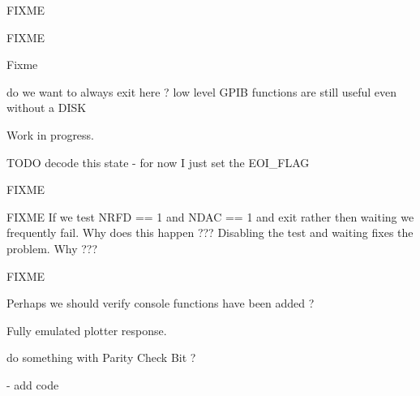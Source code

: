 \begin{DoxyRefList}
F\+I\+X\+ME 

F\+I\+X\+ME 

Fixme  
\item[\label{todo__todo000016}%
\hypertarget{todo__todo000016}{}%
Global \hyperlink{gpib__task_8h_a903eb44d83bf8f2db71e6f32a35fec62}{gpib\+\_\+error\+\_\+test} (uint16\+\_\+t val)]do we want to always exit here ? low level G\+P\+IB functions are still useful even without a D\+I\+SK  
\item[\label{todo__todo000012}%
\hypertarget{todo__todo000012}{}%
Global \hyperlink{format_8c_ad9c8cb11032d1cc2335ef13f6942170a}{gpib\+\_\+format\+\_\+disk} (char $\ast$name)]Work in progress.  
\item[\label{todo__todo000015}%
\hypertarget{todo__todo000015}{}%
Global \hyperlink{gpib_8h_a67f7cdca85091b3eb0eea0051a200fbe}{gpib\+\_\+read\+\_\+str} (uint8\+\_\+t $\ast$buf, int size, uint16\+\_\+t $\ast$status)]T\+O\+DO decode this state -\/ for now I just set the E\+O\+I\+\_\+\+F\+L\+AG  
\item[\label{todo__todo000021}%
\hypertarget{todo__todo000021}{}%
Global \hyperlink{gpib__tests_8h_aed0c6a0a794f33d5cf7691c96d3e4955}{gpib\+\_\+tests} (char $\ast$str)]F\+I\+X\+ME  
\item[\label{todo__todo000013}%
\hypertarget{todo__todo000013}{}%
Global \hyperlink{gpib_8h_ac3d50cc1d56705d107e2f8fb00692e68}{gpib\+\_\+write\+\_\+byte} (uint16\+\_\+t ch)]F\+I\+X\+ME If we test N\+R\+FD == 1 and N\+D\+AC == 1 and exit rather then waiting we frequently fail. Why does this happen ??? Disabling the test and waiting fixes the problem. Why ??? 

F\+I\+X\+ME  
\item[\label{todo__todo000067}%
\hypertarget{todo__todo000067}{}%
Global \hyperlink{posix_8h_a31986cce890109c211ccb14151aafd0e}{isatty} (int fileno)]Perhaps we should verify console functions have been added ?  
\item[\label{todo__todo000022}%
\hypertarget{todo__todo000022}{}%
Global \hyperlink{printer_8h_a72686fe9d4969430b6ef1f1fe68a6efe}{P\+R\+I\+N\+T\+E\+R\+\_\+\+C\+O\+M\+M\+A\+N\+DS} (uint8\+\_\+t ch)]Fully emulated plotter response.  
\item[\label{todo__todo000063}%
\hypertarget{todo__todo000063}{}%
Global \hyperlink{ss80_8h_a9efbe3d75e86d4003a9fbf1c8cd69919}{S\+S80\+\_\+\+Amigo\+\_\+\+Clear} (void)]do something with Parity Check Bit ?  
\item[\label{todo__todo000064}%
\hypertarget{todo__todo000064}{}%
Global \hyperlink{ss80_8h_a21c26f6bd9041fecdeed562156b0ae92}{S\+S80\+\_\+\+Cancel} (int u)]-\/ add code 


\end{DoxyRefList}
